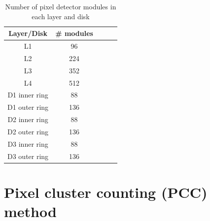 \begin{table}
  \begin{center}
    \begin{tabular}{ccccc}  
    \textbf{Layer/Disk}   & \textbf{\# modules} \\ \hline
     L1      &    96        \\  
       L2    &     224   \\ 
        L3   &       352 \\ 
         L4   &       512 \\ 
         D1 inner ring & 88     \\ 
         D1 outer ring &   136    \\ 
         D2 inner ring &      88 \\ 
         D2 outer ring &   136   \\ 
          D3 inner ring&     88  \\ 
         D3 outer ring &    136  \\ 
      \end{tabular}
    \caption{Number of pixel detector modules in each layer and disk}
    \label{tab:modpix}
  \end{center}
\end{table}



\section{Pixel cluster counting (PCC) method}

